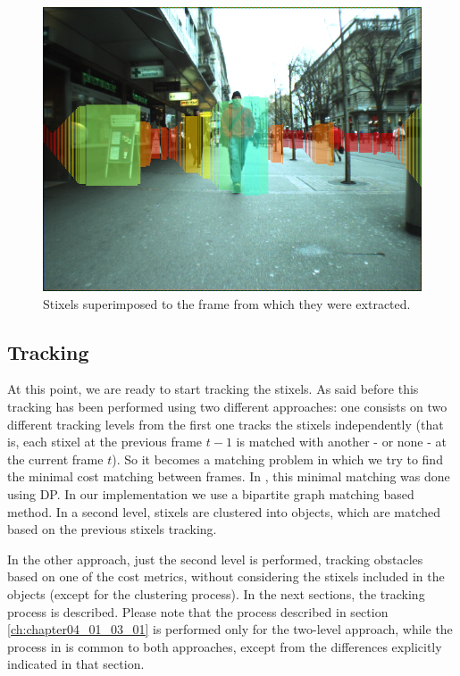 \begin{figure}[h!]
  \centering
  \includegraphics{stixels_over_original}
  \caption{Stixels superimposed to the frame from which they were extracted.}\label{fig:cp04_stixels}
\end{figure}

\subsection{Tracking}\label{ch:chapter04_01_03}

At this point, we are ready to start tracking the stixels. As said before this tracking has been performed using two different approaches: one consists on two different tracking levels from the first one tracks the stixels independently (that is, each stixel at the previous frame $t - 1$ is matched with another - or none - at the current frame $t$). So it becomes a matching problem in which we try to find the minimal cost matching between frames. In \cite{gunyel2012stixels}, this minimal matching was done using \ac{DP}. In our implementation we use a bipartite graph matching based method. In a second level, stixels are clustered into objects, which are matched based on the previous stixels tracking.

In the other approach, just the second level is performed, tracking obstacles based on one of the cost metrics, without considering the stixels included in the objects (except for the clustering process). In the next sections, the tracking process is described. Please note that the process described in section \ref{ch:chapter04_01_03_01} is performed only for the two-level approach, while the process in \label{ch:chapter04_01_04} is common to both approaches, except from the differences explicitly indicated in that section.


